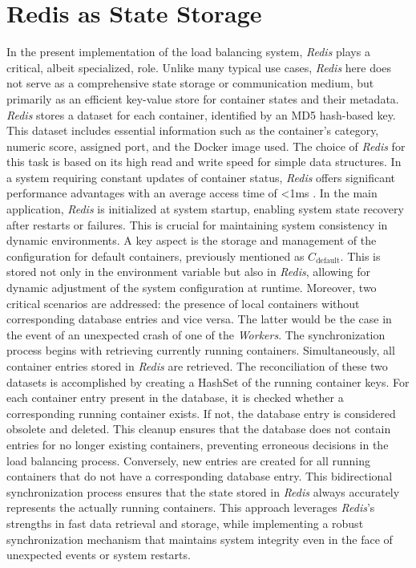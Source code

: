 \documentclass[twocolumn]{webofc}
\begin{document}
    \section{Redis as State Storage}
    In the present implementation of the load balancing system, \textit{Redis} plays a critical, albeit specialized, role. Unlike many typical use cases, \textit{Redis} here does not serve as a comprehensive state storage or communication medium, but primarily as an efficient key-value store for container states and their metadata. \textit{Redis} stores a dataset for each container, identified by an MD5 hash-based key. This dataset includes essential information such as the container's category, numeric score, assigned port, and the Docker image used. The choice of \textit{Redis} for this task is based on its high read and write speed for simple data structures.
    In a system requiring constant updates of container status, \textit{Redis} offers significant performance advantages with an average access time of <1ms \cite{redis_docs}. In the main application, \textit{Redis} is initialized at system startup, enabling system state recovery after restarts or failures. This is crucial for maintaining system consistency in dynamic environments. A key aspect is the storage and management of the configuration for default containers, previously mentioned as \( C_{\text{default}} \). This is stored not only in the environment variable but also in \textit{Redis}, allowing for dynamic adjustment of the system configuration at runtime. Moreover, two critical scenarios are addressed: the presence of local containers without corresponding database entries and vice versa. The latter would be the case in the event of an unexpected crash of one of the \textit{Workers}. The synchronization process begins with retrieving currently running containers. Simultaneously, all container entries stored in \textit{Redis} are retrieved. The reconciliation of these two datasets is accomplished by creating a HashSet of the running container keys. For each container entry present in the database, it is checked whether a corresponding running container exists. If not, the database entry is considered obsolete and deleted. This cleanup ensures that the database does not contain entries for no longer existing containers, preventing erroneous decisions in the load balancing process. Conversely, new entries are created for all running containers that do not have a corresponding database entry. This bidirectional synchronization process ensures that the state stored in \textit{Redis} always accurately represents the actually running containers. This approach leverages \textit{Redis}'s strengths in fast data retrieval and storage, while implementing a robust synchronization mechanism that maintains system integrity even in the face of unexpected events or system restarts.
\end{document}
